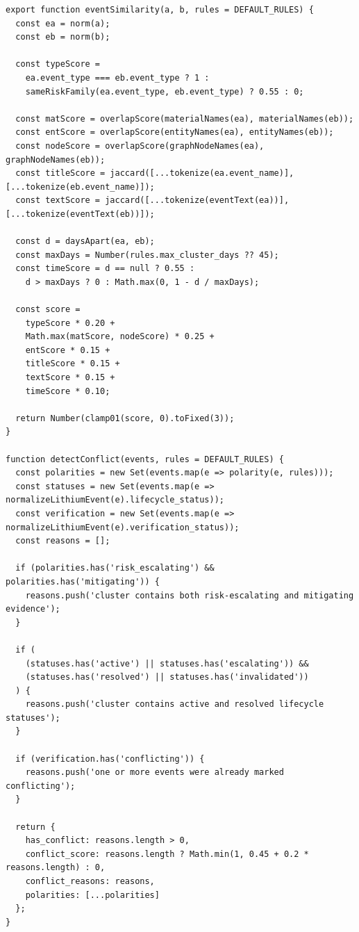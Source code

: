 \documentclass[12pt,a4paper]{article}
\begin{document}
\begin{lstlisting}[style=projectcode,caption={Trust Graph 事件相似度、聚类与置信度计算}]
export function eventSimilarity(a, b, rules = DEFAULT_RULES) {
  const ea = norm(a);
  const eb = norm(b);

  const typeScore =
    ea.event_type === eb.event_type ? 1 :
    sameRiskFamily(ea.event_type, eb.event_type) ? 0.55 : 0;

  const matScore = overlapScore(materialNames(ea), materialNames(eb));
  const entScore = overlapScore(entityNames(ea), entityNames(eb));
  const nodeScore = overlapScore(graphNodeNames(ea), graphNodeNames(eb));
  const titleScore = jaccard([...tokenize(ea.event_name)], [...tokenize(eb.event_name)]);
  const textScore = jaccard([...tokenize(eventText(ea))], [...tokenize(eventText(eb))]);

  const d = daysApart(ea, eb);
  const maxDays = Number(rules.max_cluster_days ?? 45);
  const timeScore = d == null ? 0.55 :
    d > maxDays ? 0 : Math.max(0, 1 - d / maxDays);

  const score =
    typeScore * 0.20 +
    Math.max(matScore, nodeScore) * 0.25 +
    entScore * 0.15 +
    titleScore * 0.15 +
    textScore * 0.15 +
    timeScore * 0.10;

  return Number(clamp01(score, 0).toFixed(3));
}

function detectConflict(events, rules = DEFAULT_RULES) {
  const polarities = new Set(events.map(e => polarity(e, rules)));
  const statuses = new Set(events.map(e => normalizeLithiumEvent(e).lifecycle_status));
  const verification = new Set(events.map(e => normalizeLithiumEvent(e).verification_status));
  const reasons = [];

  if (polarities.has('risk_escalating') && polarities.has('mitigating')) {
    reasons.push('cluster contains both risk-escalating and mitigating evidence');
  }

  if (
    (statuses.has('active') || statuses.has('escalating')) &&
    (statuses.has('resolved') || statuses.has('invalidated'))
  ) {
    reasons.push('cluster contains active and resolved lifecycle statuses');
  }

  if (verification.has('conflicting')) {
    reasons.push('one or more events were already marked conflicting');
  }

  return {
    has_conflict: reasons.length > 0,
    conflict_score: reasons.length ? Math.min(1, 0.45 + 0.2 * reasons.length) : 0,
    conflict_reasons: reasons,
    polarities: [...polarities]
  };
}


\end{lstlisting}
\end{document}
